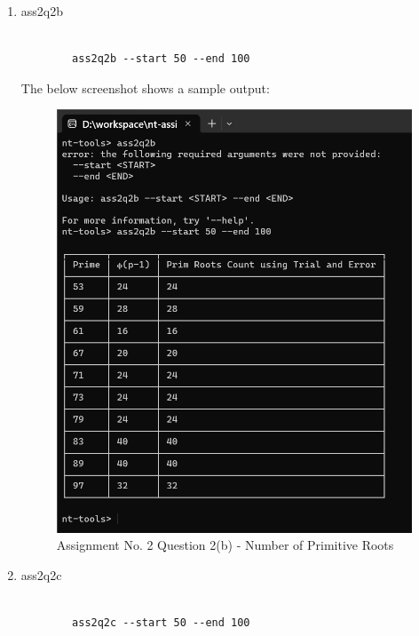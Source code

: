 \documentclass{article}
\begin{document}
\begin{enumerate}
        \item ass2q2b
        \begin{lstlisting}[style=DOS]

        ass2q2b --start 50 --end 100
        \end{lstlisting}

        The below screenshot shows a sample output:
        \begin{figure}[H]
            \centering
            \includegraphics[scale=0.5]{primitive-roots-count.png}
            \caption{Assignment No. 2 Question 2(b) - Number of Primitive Roots}
        \end{figure}

        \item ass2q2c
        \begin{lstlisting}[style=DOS]

        ass2q2c --start 50 --end 100
        \end{lstlisting}


\end{enumerate}
\end{document}
